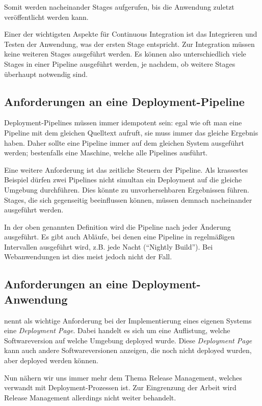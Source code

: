 Somit werden nacheinander Stages aufgerufen, bis die Anwendung zuletzt ver\-öf\-fent\-licht werden kann.

Einer der wichtigsten Aspekte für Continuous Integration ist das Integrieren und Testen der Anwendung, was der ersten Stage entspricht. Zur Integration müssen keine weiteren Stages ausgeführt werden. Es können also unterschiedlich viele Stages in einer Pipeline ausgeführt werden, je nachdem, ob weitere Stages überhaupt notwendig sind.

\subsection{Anforderungen an eine Deployment-Pipeline}

Deployment-Pipelines müssen immer idempotent sein: egal wie oft man eine Pipeline mit dem gleichen Quelltext aufruft, sie muss immer das gleiche Ergebnis haben. Daher sollte eine Pipeline immer auf dem gleichen System ausgeführt werden; bestenfalls eine Maschine, welche alle Pipelines ausführt. \citep[155]{Humble2010}

Eine weitere Anforderung ist das zeitliche Steuern der Pipeline. Als krassestes Beispiel dürfen zwei Pipelines nicht simultan ein Deployment auf die gleiche Umgebung durchführen. Dies könnte zu unvorhersehbaren Ergebnissen führen. Stages, die sich gegenseitig beeinflussen können, müssen demnach nacheinander ausgeführt werden. \citep[119]{Humble2010}

In der oben genannten Definition wird die Pipeline nach jeder Änderung ausgeführt. Es gibt auch Abläufe, bei denen eine Pipeline in regelmäßigen Intervallen ausgeführt wird, z.B. jede Nacht (``Nightly Build''). Bei Webanwendungen ist dies meist jedoch nicht der Fall.

\subsection{Anforderungen an eine Deployment-Anwendung}

\citet[127]{Humble2010} nennt als wichtige Anforderung bei der Implementierung eines eigenen Systems eine \emph{Deployment Page}. Dabei handelt es sich um eine Auflistung, welche Softwareversion auf welche Umgebung deployed wurde. Diese \emph{Deployment Page} kann auch andere Softwareversionen anzeigen, die noch nicht deployed wurden, aber deployed werden können.

Nun nähern wir uns immer mehr dem Thema Release Management, welches verwandt mit Deployment-Prozessen ist. Zur Eingrenzung der Arbeit wird Release Management allerdings nicht weiter behandelt.
